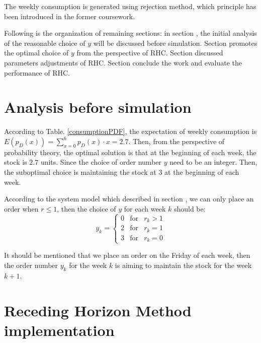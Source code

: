 \documentclass[letterpaper, 10 pt, conference]{ieeeconf}
\begin{document}
The weekly consumption is generated using rejection method, which principle has been introduced in the former coursework.

Following is the organization of remaining sections: in section \uppercase\expandafter{}, the initial analysis of the reasonable choice of $y$ will be discussed before simulation. Section \uppercase\expandafter{} promotes the optimal choice of $y$ from the perspective of RHC. Section \uppercase\expandafter{} discussed parameters adjustments of RHC.  Section \uppercase\expandafter{} conclude the work and evaluate the performance of RHC.


\section{Analysis before simulation}
According to Table. \ref{consumptionPDF}, the expectation of weekly consumption is $E(p_D(x)) = \sum \limits_{x=0}^6 p_D(x) \cdot x = 2.7$. Then, from the perspective of probability theory, the optimal solution is that at the beginning of each week, the stock is $2.7$ units. Since the choice of order number $y$ need to be an integer. Then, the suboptimal choice is maintaining the stock at $3$ at the beginning of each week.

According to the system model which described in section \uppercase\expandafter{}, we can only place an order when $r \leq 1$, then the choice of $y$ for each week $k$ should be:
\begin{equation}
  y_k =     \left\{
  \begin{array}{rcl}
    0  & \mbox{for} & r_{k}>1  \\
    2 & \mbox{for} & r_{k}=1 \\
    3  & \mbox{for} & r_{k}=0
  \end{array}\right.
\end{equation}

It should be mentioned that we place an order on the Friday of each week, then the order number $y_k$ for the week $k$ is aiming to maintain the stock for the week $k+1$.

\section{Receding Horizon Method implementation}
\end{document}
